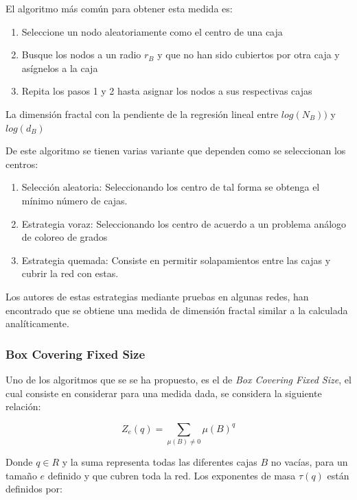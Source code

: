 El algoritmo más común para obtener esta medida es:

\begin{enumerate}
    \item Seleccione un nodo aleatoriamente como el centro de una caja
    \item Busque los nodos a un radio $r_B$ y que no han sido cubiertos por otra caja y asígnelos a la caja
    \item Repita los pasos 1 y 2 hasta asignar los nodos a sus respectivas cajas
\end{enumerate}

La dimensión fractal con la pendiente de la regresión lineal entre $log(N_B))$ y $log(d_B)$

De este algoritmo se tienen varias variante que dependen como se seleccionan los centros:

\begin{enumerate}
    \item Selección aleatoria\cite{Kim2007B}: Seleccionando los centro de tal forma se obtenga el mínimo número de cajas.
    \item Estrategia voraz\cite{Song2007}: Seleccionando los centro de acuerdo a un problema análogo de coloreo de grados
    \item Estrategia quemada\cite{Song2007}: Consiste en permitir solapamientos entre las cajas  y cubrir la red con estas.
\end{enumerate}

Los autores de estas estrategias mediante pruebas en algunas redes, han encontrado que se obtiene una medida de dimensión fractal similar a la calculada analíticamente.



\subsubsection{Box Covering Fixed Size}

Uno de los algoritmos que se se ha propuesto, es el de \textit{Box Covering Fixed Size}\cite{Halsey1986}\cite{RendondelaTorre2017}\cite{Yu2003}, el cual consiste en considerar para una medida dada, se considera la siguiente relación:

\begin{equation}
    Z_e(q) =  \sum \limits_{\mu(B) \neq 0} \mu(B)^q
\end{equation}

Donde $q\in R$ y la suma representa todas las diferentes cajas $B$ no vacías, para un tamaño $e$ definido y que cubren toda la red. Los exponentes de masa $\tau(q)$ están definidos por:

